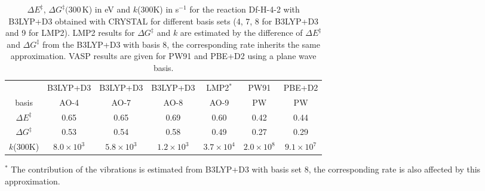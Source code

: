 \documentclass[11pt,DIV=13,BCOR=5mm,a4paper,headinclude]{scrbook}
\begin{document}
\begin{table}[!h]
  \centering
  \caption{$\Delta E^\ddagger$, $\Delta G^\ddagger(300\,$K) in eV and $k$(300K) in s$^{-1}$ for the reaction Df-H-4-2 with B3LYP+D3 obtained with CRYSTAL for different basis sets (4, 7, 8 for B3LYP+D3 and 9 for LMP2).
  LMP2 results for $\Delta G^\ddagger$ and $k$ are estimated by the difference of $\Delta E^\ddagger$ and $\Delta G^\ddagger$ from the B3LYP+D3 with basis 8, the corresponding rate inherits the same approximation.
  VASP results are given for PW91 and PBE+D2 using a plane wave basis.}
  \begin{tabular}{c|ccc|c|cc}%
  \toprule
    & B3LYP+D3 &B3LYP+D3 &B3LYP+D3&LMP2$^\ast$ &PW91&PBE+D2\\
    basis&AO-4&AO-7&AO-8&AO-9&PW&PW\\\midrule
   $\Delta E^\ddagger$ &0.65 &0.65 &0.69 & 0.60&0.42&0.44\\
   $\Delta G^\ddagger$ &0.53 &0.54 &0.58 & 0.49 &0.27&0.29\\
   $k$(300K) &$8.0\times 10^3$ &$5.8\times 10^3$ &$1.2\times 10^3$ & $3.7\times 10^{4}$&$2.0\times 10^8$ &$9.1\times 10^7$\\\bottomrule 
  \end{tabular}
  \begin{tablenotes}
 \footnotesize
\item[] $^\ast$ The contribution of the vibrations is estimated from B3LYP+D3 with basis set 8, the corresponding rate is also affected by this approximation.
\end{tablenotes}
  \label{tab:k_crystal-reopt+noopt}
\end{table}
\end{document}
